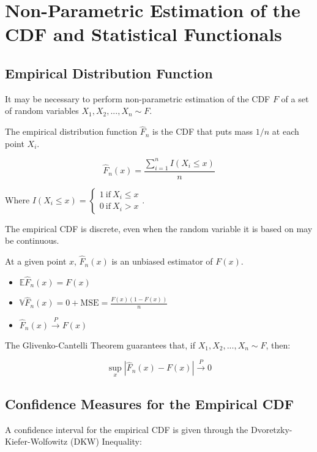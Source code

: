 \section{Non-Parametric Estimation of the CDF and Statistical Functionals}

\subsection{Empirical Distribution Function}
It may be necessary to perform non-parametric estimation of the CDF $F$ of a set of random variables $X_1, X_2, ... , X_n \sim F$. 

The empirical distribution function $\hat{F}_n$ is the CDF that puts mass $1/n$ at each point $X_i$.

\begin{equation}
\hat{F}_n(x) = \frac{\sum_{i=1}^n I(X_i \leq x)}{n}
\end{equation}

Where $I(X_i \leq x) = \left\{\begin{array}{c} 1\ \mathrm{if\ } X_i \leq x\\ 0\ \mathrm{if\ } X_i > x \end{array} \right.$. 

The empirical CDF is discrete, even when the random variable it is based on may be continuous. 

At a given point $x$, $\hat{F}_n(x)$ is an unbiased estimator of $F(x)$. 

\begin{itemize}
\item $\mathbb{E}\hat{F}_n(x) = F(x)$
\item $\mathbb{V}\hat{F}_n(x) = 0+\mathrm{MSE} = \frac{F(x)(1-F(x))}{n}$
\item $\hat{F}_n(x) \xrightarrow{P} F(x)$
\end{itemize}

The Glivenko-Cantelli Theorem guarantees that, if $X_1,X_2,...,X_n \sim F$, then:

\begin{equation}
\sup_x |\hat{F}_n(x) - F(x)|\xrightarrow{P} 0
\end{equation}

\subsection{Confidence Measures for the Empirical CDF}
A confidence interval for the empirical CDF is given through the Dvoretzky-Kiefer-Wolfowitz (DKW) Inequality:

